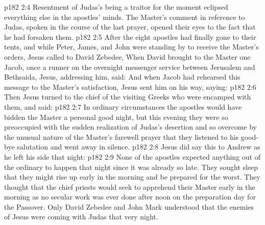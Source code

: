\vs p182 2:4 Resentment of Judas’s being a traitor for the moment eclipsed everything else in the apostles’ minds. The Master’s comment in reference to Judas, spoken in the course of the last prayer, opened their eyes to the fact that he had forsaken them.
\vs p182 2:5 \pc After the eight apostles had finally gone to their tents, and while Peter, James, and John were standing by to receive the Master’s orders, Jesus called to David Zebedee,  When David brought to the Master one Jacob, once a runner on the overnight messenger service between Jerusalem and Bethsaida, Jesus, addressing him, said:  And when Jacob had rehearsed this message to the Master’s satisfaction, Jesus sent him on his way, saying: 
\vs p182 2:6 Then Jesus turned to the chief of the visiting Greeks who were encamped with them, and said: 
\vs p182 2:7 \pc In ordinary circumstances the apostles would have bidden the Master a personal good night, but this evening they were so preoccupied with the sudden realization of Judas’s desertion and so overcome by the unusual nature of the Master’s farewell prayer that they listened to his good\hyp{}bye salutation and went away in silence.
\vs p182 2:8 Jesus did say this to Andrew as he left his side that night: 
\vs p182 2:9 None of the apostles expected anything out of the ordinary to happen that night since it was already so late. They sought sleep that they might rise up early in the morning and be prepared for the worst. They thought that the chief priests would seek to apprehend their Master early in the morning as no secular work was ever done after noon on the preparation day for the Passover. Only David Zebedee and John Mark understood that the enemies of Jesus were coming with Judas that very night.
